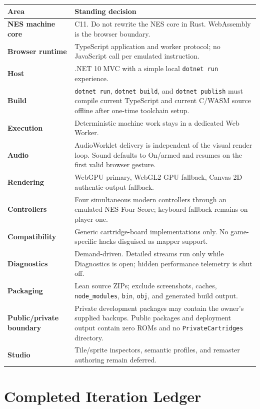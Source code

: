 \documentclass[10pt,letterpaper]{article}
\newcommand{\code}[1]{\texttt{\small #1}}
\begin{document}
\begin{longtable}{>{\bfseries}p{1.75in}p{5.55in}}
\toprule
Area & Standing decision \\
\midrule
\endhead
NES machine core & C11. Do not rewrite the NES core in Rust. WebAssembly is the browser boundary. \\
Browser runtime & TypeScript application and worker protocol; no JavaScript call per emulated instruction. \\
Host & .NET 10 MVC with a simple local \code{dotnet run} experience. \\
Build & \code{dotnet run}, \code{dotnet build}, and \code{dotnet publish} must compile current TypeScript and current C/WASM source offline after one-time toolchain setup. \\
Execution & Deterministic machine work stays in a dedicated Web Worker. \\
Audio & AudioWorklet delivery is independent of the visual render loop. Sound defaults to On/armed and resumes on the first valid browser gesture. \\
Rendering & WebGPU primary, WebGL2 GPU fallback, Canvas 2D authentic-output fallback. \\
Controllers & Four simultaneous modern controllers through an emulated NES Four Score; keyboard fallback remains on player one. \\
Compatibility & Generic cartridge-board implementations only. No game-specific hacks disguised as mapper support. \\
Diagnostics & Demand-driven. Detailed streams run only while Diagnostics is open; hidden performance telemetry is shut off. \\
Packaging & Lean source ZIPs; exclude screenshots, caches, \code{node\_modules}, \code{bin}, \code{obj}, and generated build output. \\
Public/private boundary & Private development packages may contain the owner's supplied backups. Public packages and deployment output contain zero ROMs and no \code{PrivateCartridges} directory. \\
Studio & Tile/sprite inspectors, semantic profiles, and remaster authoring remain deferred. \\
\bottomrule
\end{longtable}

\section{Completed Iteration Ledger}
\end{document}
